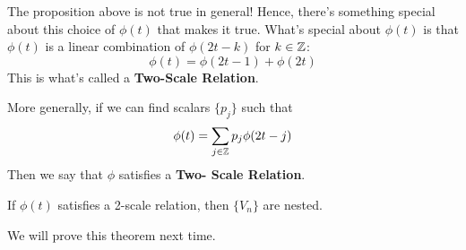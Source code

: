 \documentclass{article}
\begin{document}
The proposition above is not true in general! Hence, there's something special about this choice of $\phi(t)$ that makes it true. What's special about $\phi(t)$ is that $\phi(t)$ is a linear combination of $\phi(2t - k)$ for $k \in \mathbb{Z}$:
    \[\phi(t) = \phi(2t - 1) + \phi(2t)\]
This is what's called a \textbf{Two-Scale Relation}.\\

\begin{definition}
More generally, if we can find scalars $\{ p_j \}$ such that
\[\phi(t) = \sum_{j \in \mathbb{Z}} p_j \phi(2t - j) \]
Then we say that $\phi$ satisfies a \textbf{Two- Scale Relation}.
\end{definition}

\begin{theorem}
    If $\phi(t)$ satisfies a 2-scale relation, then $\{V_n\}$ are nested.
\end{theorem}

We will prove this theorem next time.
\end{document}
